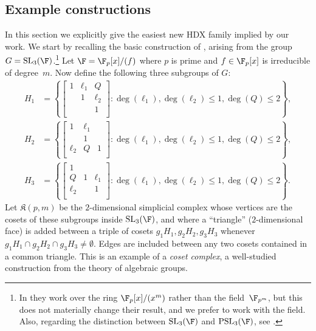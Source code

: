\documentclass[11pt]{article}
\newcommand{\SL}{{\mathrm{SL}}}
\newcommand{\PSL}{{\mathrm{PSL}}}
\newcommand{\complex}{\mathfrak{K}}
\begin{document}
\subsection{Example constructions}  \label{sec:eg}
In this section we explicitly give the easiest new HDX family implied by our work.
We start by recalling the basic construction of \cite{KO18}, arising from the group $G = \SL_3(\F)$.\footnote{In \cite{KO18} they work over the ring $\F_p[x]/(x^m)$ rather than the field~$\F_{p^m}$, but this does not materially change their result, and we prefer to work with the field.  Also, regarding the distinction between $\SL_3(\F)$ and $\PSL_3(\F)$, see .}
Let $\F = \F_p[x]/( f )$ where $p$ is prime and $f \in \F_p[x]$ is irreducible of degree~$m$.
Now define the following three subgroups of $G$:
\begin{align*}
H_1 &= \left \{\begin{bmatrix}
1 & \ell_1 & Q \\
 & 1 & \ell_2 \\
 &  & 1\\
\end{bmatrix} : \deg(\ell_1) , \deg(\ell_2) \le 1, \deg(Q) \le 2 \right \},\\
H_2 &= \left \{ \begin{bmatrix}
1 & \ell_1 &  \\
 & 1 &  \\
\ell_2 & Q & 1\\
\end{bmatrix}: \deg(\ell_1) , \deg(\ell_2) \le 1, \deg(Q) \le 2 \right \},\\
H_3 &= \left \{ \begin{bmatrix}
1 &  & \\
Q & 1 & \ell_1 \\
\ell_2 &  & 1\\
\end{bmatrix} : \deg(\ell_1) , \deg(\ell_2) \le 1, \deg(Q) \le 2 \right \}.
\end{align*}
Let $\complex(p,m)$ be the $2$-dimensional simplicial complex whose vertices are the cosets of these subgroups inside $\SL_3(\F)$, and where a ``triangle'' ($2$-dimensional face) is added between a triple of cosets $g_1 H_1,g_2 H_2,g_3 H_3$ whenever $g_1 H_1 \cap g_2 H_2 \cap g_3 H_3 \neq \emptyset$. Edges are included between any two cosets contained in a common triangle. This is an example of a \emph{coset complex}, a well-studied construction from the theory of algebraic groups.
\end{document}
